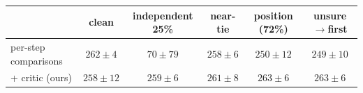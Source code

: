 \begin{tabular}{lccccc}
\toprule
 & clean & independent 25\% & near-tie & position (72\%) & unsure$\to$first \\
\midrule
per-step comparisons & $262\pm4$ & $70\pm79$ & $258\pm6$ & $250\pm12$ & $249\pm10$ \\
+ critic (ours) & $258\pm12$ & $259\pm6$ & $261\pm8$ & $263\pm6$ & $263\pm6$ \\
\bottomrule
\end{tabular}
